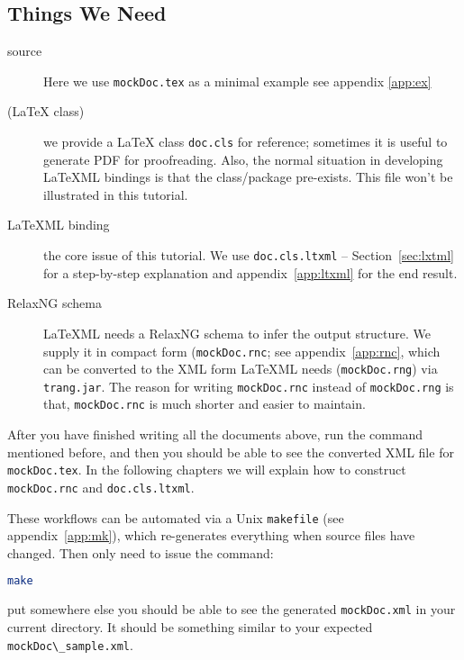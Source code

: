 \documentclass[a4paper]{article}
\def\latexml{{\LaTeX}ML\xspace}
\begin{document}
\subsection{Things We Need}
\begin{description}
\item[source] Here we use \lstinline|mockDoc.tex| as a minimal example see appendix \ref{app:ex}
\item[({\LaTeX} class)] we provide a {\LaTeX} class \lstinline|doc.cls| for reference;
  sometimes it is useful to generate PDF for proofreading. Also, the normal situation in
  developing \latexml bindings is that the class/package pre-exists. This file won't be
  illustrated in this tutorial. 
\item[\latexml binding] the core issue of this tutorial. We use \lstinline|doc.cls.ltxml|
  -- Section~\ref{sec:lxtml} for a step-by-step explanation and appendix~\ref{app:ltxml}
  for the end result.
\item[RelaxNG schema] \latexml needs a RelaxNG schema to infer the output structure. We
  supply it in compact form (\lstinline|mockDoc.rnc|; see appendix~\ref{app:rnc}, which
  can be converted to the XML form \latexml needs (\lstinline|mockDoc.rng|) via
  \lstinline|trang.jar|.  The reason for writing \lstinline|mockDoc.rnc| instead of
  \lstinline|mockDoc.rng| is that, \lstinline|mockDoc.rnc| is much shorter and easier to
  maintain. 
\end{description}
After you have finished writing all the documents above, run the command mentioned before,
and then you should be able to see the converted XML file for \lstinline|mockDoc.tex|. In
the following chapters we will explain how to construct \lstinline|mockDoc.rnc| and
\lstinline|doc.cls.ltxml|.

These workflows can be automated via a Unix \lstinline|makefile| (see
appendix~\ref{app:mk}), which re-generates everything when source files have changed. Then
only need to issue the command:
\begin{lstlisting}[language=bash]
make
\end{lstlisting}
\begin{oldpart}{put somewhere else}
  you should be able to see the generated \lstinline|mockDoc.xml| in your current
  directory. It should be something similar to your expected
  \lstinline|mockDoc\_sample.xml|.
\end{oldpart}
\end{document}
